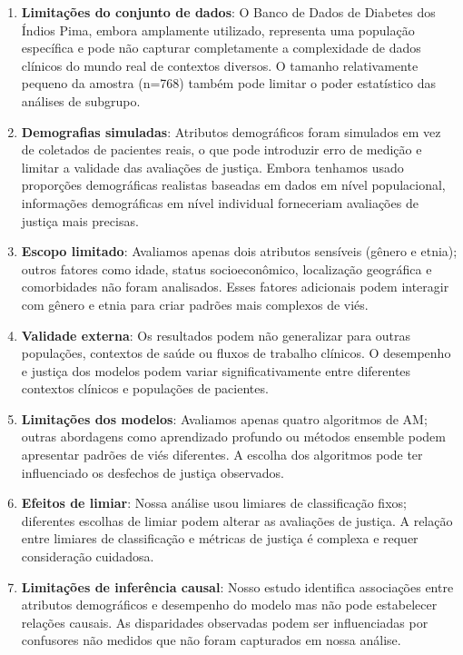 \begin{enumerate}[leftmargin=*]
    \item \textbf{Limitações do conjunto de dados}: O Banco de Dados de 
          Diabetes dos Índios Pima, embora amplamente utilizado, representa 
          uma população específica e pode não capturar completamente a 
          complexidade de dados clínicos do mundo real de contextos diversos. 
          O tamanho relativamente pequeno da amostra (n=768) também pode 
          limitar o poder estatístico das análises de subgrupo.
    
    \item \textbf{Demografias simuladas}: Atributos demográficos foram 
          simulados em vez de coletados de pacientes reais, o que pode 
          introduzir erro de medição e limitar a validade das avaliações 
          de justiça. Embora tenhamos usado proporções demográficas 
          realistas baseadas em dados em nível populacional, informações 
          demográficas em nível individual forneceriam avaliações de 
          justiça mais precisas.
    
    \item \textbf{Escopo limitado}: Avaliamos apenas dois atributos 
          sensíveis (gênero e etnia); outros fatores como idade, status 
          socioeconômico, localização geográfica e comorbidades não foram 
          analisados. Esses fatores adicionais podem interagir com gênero 
          e etnia para criar padrões mais complexos de viés.
    
    \item \textbf{Validade externa}: Os resultados podem não generalizar 
          para outras populações, contextos de saúde ou fluxos de trabalho 
          clínicos. O desempenho e justiça dos modelos podem variar 
          significativamente entre diferentes contextos clínicos e 
          populações de pacientes.
    
    \item \textbf{Limitações dos modelos}: Avaliamos apenas quatro 
          algoritmos de AM; outras abordagens como aprendizado profundo 
          ou métodos ensemble podem apresentar padrões de viés diferentes. 
          A escolha dos algoritmos pode ter influenciado os desfechos 
          de justiça observados.
    
    \item \textbf{Efeitos de limiar}: Nossa análise usou limiares de 
          classificação fixos; diferentes escolhas de limiar podem alterar 
          as avaliações de justiça. A relação entre limiares de classificação 
          e métricas de justiça é complexa e requer consideração cuidadosa.
    
    \item \textbf{Limitações de inferência causal}: Nosso estudo identifica 
          associações entre atributos demográficos e desempenho do modelo 
          mas não pode estabelecer relações causais. As disparidades 
          observadas podem ser influenciadas por confusores não medidos 
          que não foram capturados em nossa análise.
\end{enumerate}

